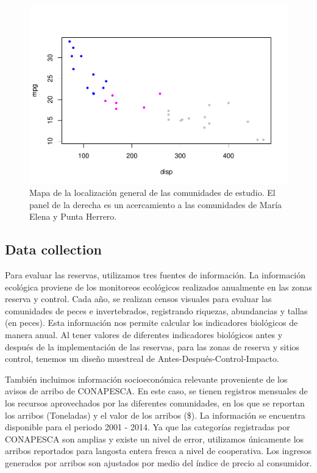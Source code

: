 \documentclass{frontiersSCNS}
\begin{document}
\begin{figure}
\centering
\includegraphics{Villasenor-Derbez_files/figure-latex/unnamed-chunk-1-1.pdf}
\caption{\label{fig:unnamed-chunk-1}\label{fig:map}Mapa de la localización
general de las comunidades de estudio. El panel de la derecha es un
acercamiento a las comunidades de María Elena y Punta Herrero.}
\end{figure}

\subsection{Data collection}\label{data-collection}

Para evaluar las reservas, utilizamos tres fuentes de información. La
información ecológica proviene de los monitoreos ecológicos realizados
anualmente en las zonas reserva y control. Cada año, se realizan censos
visuales para evaluar las comunidades de peces e invertebrados,
registrando riquezas, abundancias y tallas (en peces). Esta información
nos permite calcular los indicadores biológicos de manera anual. Al
tener valores de diferentes indicadores biológicos antes y después de la
implementación de las reservas, para las zonas de reserva y sitios
control, tenemos un diseño muestreal de Antes-Después-Control-Impacto.

También incluimos información socioeconómica relevante proveniente de
los avisos de arribo de CONAPESCA. En este caso, se tienen registros
mensuales de los recursos aprovechados por las diferentes comunidades,
en los que se reportan los arribos (Toneladas) y el valor de los arribos
(\$). La información se encuentra disponible para el periodo 2001 -
2014. Ya que las categorías registradas por CONAPESCA son amplias y
existe un nivel de error, utilizamos únicamente los arribos reportados
para langosta entera fresca a nivel de cooperativa. Los ingresos
generados por arribos son ajustados por medio del índice de precio al
consumidor.
\end{document}
